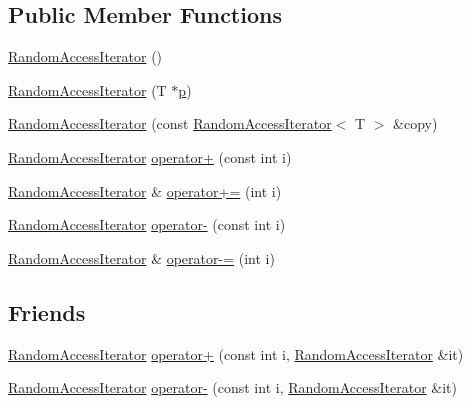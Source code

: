 \subsection*{Public Member Functions}
\begin{DoxyCompactItemize}
\item 
\hyperlink{classprism_1_1_random_access_iterator_acb6e10c9ddfe99117be8d6655636a23c}{Random\+Access\+Iterator} ()
\item 
\hyperlink{classprism_1_1_random_access_iterator_aca286b76b9426a9be2224545ecce50e5}{Random\+Access\+Iterator} (T $\ast$\hyperlink{classprism_1_1_forward_iterator_a44e23472687df2dcf68780ba6173557a}{p})
\item 
\hyperlink{classprism_1_1_random_access_iterator_a6aeddeeacdf3146e6b48b05c8f86ac65}{Random\+Access\+Iterator} (const \hyperlink{classprism_1_1_random_access_iterator}{Random\+Access\+Iterator}$<$ T $>$ \&copy)
\item 
\hyperlink{classprism_1_1_random_access_iterator}{Random\+Access\+Iterator} \hyperlink{classprism_1_1_random_access_iterator_aebe91fcd9ac3a4bc5f2f2ede7ff51f49}{operator+} (const int i)
\item 
\hyperlink{classprism_1_1_random_access_iterator}{Random\+Access\+Iterator} \& \hyperlink{classprism_1_1_random_access_iterator_af66da8fe8bd73912a18dc14cf96c237c}{operator+=} (int i)
\item 
\hyperlink{classprism_1_1_random_access_iterator}{Random\+Access\+Iterator} \hyperlink{classprism_1_1_random_access_iterator_ac530d8ed2369500753f4091eba88142c}{operator-\/} (const int i)
\item 
\hyperlink{classprism_1_1_random_access_iterator}{Random\+Access\+Iterator} \& \hyperlink{classprism_1_1_random_access_iterator_ae17e26f0b1664830170c4373e951f3a5}{operator-\/=} (int i)
\end{DoxyCompactItemize}
\subsection*{Friends}
\begin{DoxyCompactItemize}
\item 
\hyperlink{classprism_1_1_random_access_iterator}{Random\+Access\+Iterator} \hyperlink{classprism_1_1_random_access_iterator_af54fbcdeeec8255f8e3d2742c952ea22}{operator+} (const int i, \hyperlink{classprism_1_1_random_access_iterator}{Random\+Access\+Iterator} \&it)
\item 
\hyperlink{classprism_1_1_random_access_iterator}{Random\+Access\+Iterator} \hyperlink{classprism_1_1_random_access_iterator_a207fb9ff199d97104c08cc684db50dfe}{operator-\/} (const int i, \hyperlink{classprism_1_1_random_access_iterator}{Random\+Access\+Iterator} \&it)
\end{DoxyCompactItemize}
